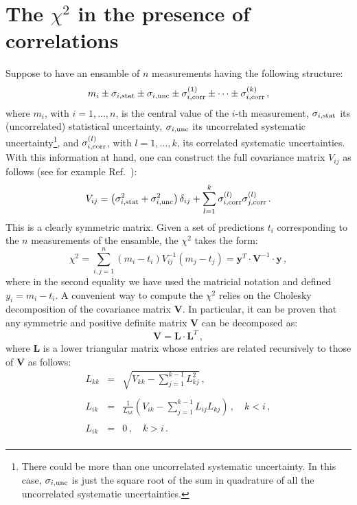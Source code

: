 \documentclass[10pt,a4paper]{article}
\begin{document}
\section{The $\chi^2$ in the presence of correlations}

Suppose to have an ensamble of $n$ measurements having the following
structure:
\begin{equation}
  m_i\pm \sigma_{i,\rm stat} \pm \sigma_{i,\rm unc} \pm \sigma_{i,\rm
    corr}^{(1)}\pm\dots \pm \sigma_{i,\rm
    corr}^{(k)}\,,
\end{equation}
where $m_i$, with $i=1,\dots, n$, is the central value of the $i$-th
measurement, $\sigma_{i,\rm stat}$ its (uncorrelated) statistical
uncertainty, $\sigma_{i,\rm unc}$ its uncorrelated systematic
uncertainty\footnote{There could be more than one uncorrelated
  systematic uncertainty. In this case, $\sigma_{i,\rm unc}$ is just
  the square root of the sum in quadrature of all the uncorrelated
  systematic uncertainties.}, and $\sigma_{i,\rm corr}^{(l)}$, with
$l=1,\dots,k$, its correlated systematic uncertainties. With this
information at hand, one can construct the full covariance matrix
$V_{ij}$ as follows (see for example Ref.~\cite{Ball:2012wy}):
\begin{equation}\label{eq:covmat}
  V_{ij}=\left(\sigma_{i,\rm stat}^2 +\sigma_{i,\rm unc}^2\right)\delta_{ij} + \sum_{l=1}^{k}\sigma_{i,\rm
    corr}^{(l)}\sigma_{j,\rm
    corr}^{(l)}\,.
\end{equation}
This is a clearly symmetric matrix. Given a set of predictions $t_i$
corresponding to the $n$ measurements of the ensamble, the $\chi^2$
takes the form:
\begin{equation}\label{eq:chi2cov}
  \chi^2=
  \sum_{i,j=1}^{n}\left(m_i-t_i\right)V_{ij}^{-1}\left(m_j-t_j\right) =
  \mathbf{y}^{T} \cdot \mathbf{V}^{-1} \cdot \mathbf{y}\,,
\end{equation}
where in the second equality we have used the matricial notation and
defined $y_i = m_i-t_i$. A convenient way to compute the $\chi^2$
relies on the Cholesky decomposition of the covariance matrix
$\mathbf{V}$. In particular, it can be proven that any symmetric and
positive definite matrix $\mathbf{V}$ can be decomposed as:
\begin{equation}\label{eq:choleskydec}
\mathbf{V} = \mathbf{L}\cdot\mathbf{L}^{T}\,,
\end{equation}
where $\mathbf{L}$ is a lower triangular matrix whose entries are
related recursively to those of $\mathbf{V}$ as follows:
\begin{equation}\label{eq:cholalg}
\begin{array}{rcl}
  L_{kk} &=&\displaystyle \sqrt{V_{kk}-\sum_{j=1}^{k-1}L_{kj}^2}\,,\\
  \\
  L_{ik} &=&\displaystyle
             \frac{1}{L_{kk}}\left(V_{ik}-\sum_{j=1}^{k-1}L_{ij}L_{kj}\right)\,,\quad
             k < i\,,\\
\\
  L_{ik} &=&\displaystyle 0\,,\quad
             k > i\,.\\
\end{array}
\end{equation}
\end{document}
